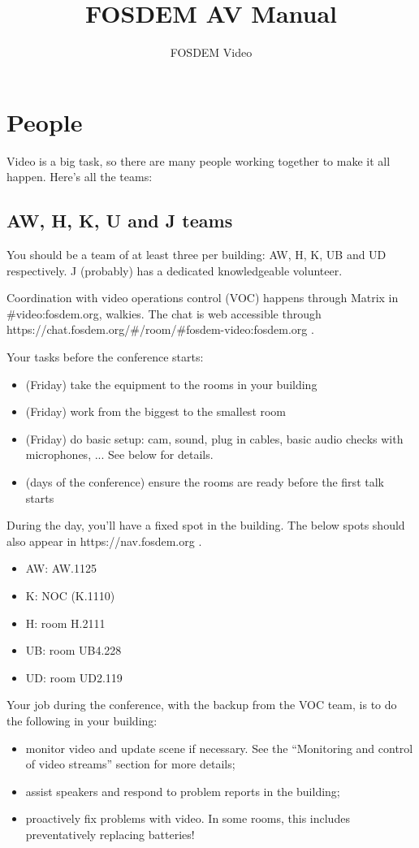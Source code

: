 \documentclass{article}
\title{FOSDEM AV Manual}
\author{FOSDEM Video}
\begin{document}
\maketitle \thispagestyle{empty}
\newpage

\tableofcontents
\newpage

\section{People}
Video is a big task, so there are many people working together to make it all happen. Here's all the teams:

\subsection{AW, H, K, U and J teams}
You should be a team of at least three per building: AW, H, K, UB and UD respectively. J (probably) has a dedicated knowledgeable volunteer.

Coordination with video operations control (VOC) happens through Matrix in \#video:fosdem.org, walkies. The chat is web accessible through https://chat.fosdem.org/\#/room/\#fosdem-video:fosdem.org .

Your tasks before the conference starts:
\begin{itemize}
  \item (Friday) take the equipment to the rooms in your building
  \item (Friday) work from the biggest to the smallest room
  \item (Friday) do basic setup: cam, sound, plug in cables, basic audio checks with microphones, ... See below for details.
  \item (days of the conference) ensure the rooms are ready before the first talk starts
\end{itemize}

During the day, you'll have a fixed spot in the building. The below spots should also appear in https://nav.fosdem.org .
\begin{itemize}
  \item AW: AW.1125
  \item K: NOC (K.1110)
  \item H: room H.2111
  \item UB: room UB4.228
  \item UD: room UD2.119
\end{itemize}

Your job during the conference, with the backup from the VOC team, is to do the following in your building:
\begin{itemize}
  \item monitor video and update scene if necessary. See the ``Monitoring and control of video streams'' section for more details;
  \item assist speakers and respond to problem reports in the building;
  \item proactively fix problems with video. In some rooms, this includes preventatively replacing batteries!
\end{itemize}
\end{document}

